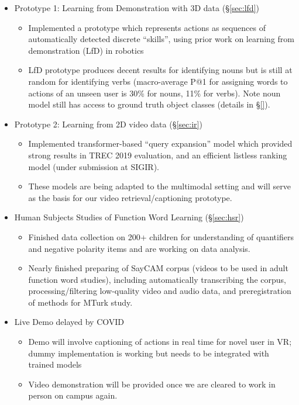 \documentclass[11pt]{article}
\begin{document}
\begin{itemize}
\item Prototype 1: Learning from Demonstration with 3D data (\S\ref{sec:lfd})
\begin{itemize}
\item Implemented a prototype which represents actions as sequences of automatically detected discrete ``skills'', using prior work on learning from demonstration (LfD) in robotics
\item LfD prototype produces decent results for identifying nouns but is still at random for identifying verbs (macro-average P@1 for assigning words to actions of an unseen user is 30\% for nouns, 11\% for verbs). Note noun model still has access to ground truth object classes (details in \S\ref{}).  
\end{itemize}
\item Prototype 2: Learning from 2D video data (\S\ref{sec:ir})
\begin{itemize}
\item Implemented transformer-based ``query expansion'' model which provided strong results in TREC 2019 evaluation, and an efficient listless ranking model (under submission at SIGIR).
\item These models are being adapted to the multimodal setting and will serve as the basis for our video retrieval/captioning prototype.
\end{itemize}
\item Human Subjects Studies of Function Word Learning (\S\ref{sec:hsr})
\begin{itemize}
\item Finished data collection on 200+ children for understanding of quantifiers and negative polarity items and are working on data analysis. 
\item Nearly finished preparing of SayCAM corpus (videos to be used in adult function word studies), including automatically transcribing the corpus, processing/filtering low-quality video and audio data, and preregistration of methods for MTurk study. 
\end{itemize}
\item Live Demo delayed by COVID
\begin{itemize}
\item Demo will involve captioning of actions in real time for novel user in VR; dummy implementation is working but needs to be integrated with trained models
\item Video demonstration will be provided once we are cleared to work in person on campus again. 
\end{itemize}
\end{itemize}
\end{document}
